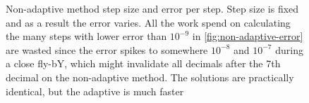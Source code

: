 \begin{figure}
{        \label{fig:non-adaptive-error}
        }
        \caption{Non-adaptive method step size and error per step. Step size is fixed and as a result the error varies. All the work spend on calculating the many steps with lower error than $10^{-9}$ in \ref{fig:non-adaptive-error} are wasted since the error spikes to somewhere $10^{-8}$ and $10^{-7}$ during a close fly-bY, which might invalidate all decimals after the 7th decimal on the non-adaptive method. The solutions are practically identical, but the adaptive is much faster}
        \label{fig:non-adaptive-steP_error}
\end{figure}


\begin{figure}
    \centering
\end{figure}
